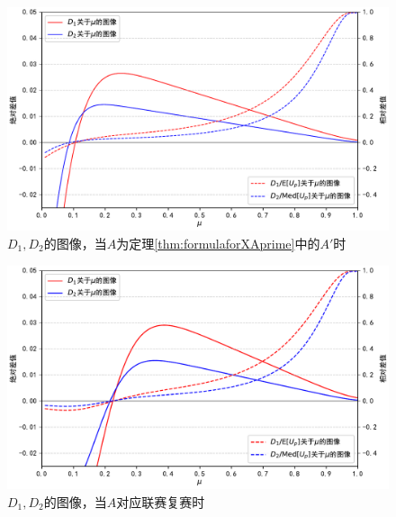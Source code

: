             \begin{figure}[htbp]
                \centering
                \includegraphics[width=\textwidth]{fig/plottingD_1D_2.pdf}
                \caption{$D_1,D_2$的图像，当$A$为定理\ref{thm:formulaforXAprime}中的$A'$时}
                \label{fig:plottingD_1D_2forAprime}
            \end{figure}

            \begin{figure}[htbp]
                \centering
                \includegraphics[width=\textwidth]{fig/plottingNoipD_1D_2.pdf}
                \caption{$D_1,D_2$的图像，当$A$对应联赛复赛时}
                \label{fig:plottingD_1D_2forNoip}
            \end{figure}

